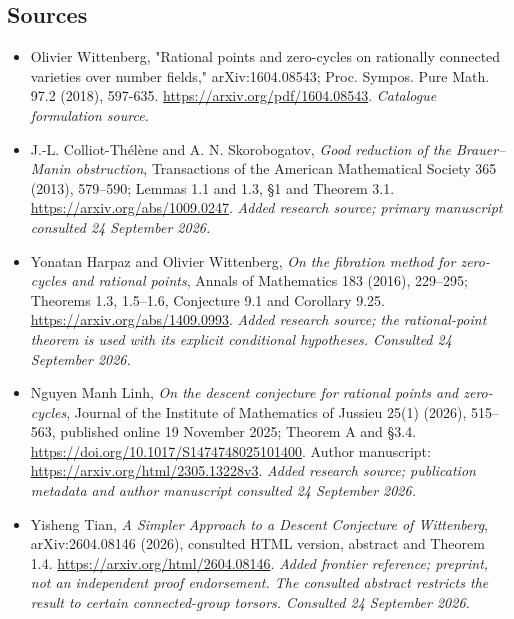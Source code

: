 \documentclass[11pt]{article}
\begin{document}
\subsection{Sources}
\begin{itemize}\raggedright
\item[\textnormal{[S1]}]\hypertarget{source:30003827:1}{} Olivier Wittenberg, "Rational points and zero-cycles on rationally connected varieties over number fields," arXiv:1604.08543; Proc. Sympos. Pure Math. 97.2 (2018), 597-635.
\url{https://arxiv.org/pdf/1604.08543}.
{\small\textit{Catalogue formulation source.}}
\item[\textnormal{[E1]}]\hypertarget{extra:30003827:1}{} J.-L. Colliot-Th\'el\`ene and A. N. Skorobogatov, \emph{Good reduction of the Brauer--Manin obstruction}, Transactions of the American Mathematical Society 365 (2013), 579--590; Lemmas 1.1 and 1.3, \S1 and Theorem 3.1. \url{https://arxiv.org/abs/1009.0247}.
{\small\textit{Added research source; primary manuscript consulted 24 September 2026.}}
\item[\textnormal{[E2]}]\hypertarget{extra:30003827:2}{} Yonatan Harpaz and Olivier Wittenberg, \emph{On the fibration method for zero-cycles and rational points}, Annals of Mathematics 183 (2016), 229--295; Theorems 1.3, 1.5--1.6, Conjecture 9.1 and Corollary 9.25. \url{https://arxiv.org/abs/1409.0993}.
{\small\textit{Added research source; the rational-point theorem is used with its explicit conditional hypotheses. Consulted 24 September 2026.}}
\item[\textnormal{[E3]}]\hypertarget{extra:30003827:3}{} Nguyen Manh Linh, \emph{On the descent conjecture for rational points and zero-cycles}, Journal of the Institute of Mathematics of Jussieu 25(1) (2026), 515--563, published online 19 November 2025; Theorem A and \S3.4. \url{https://doi.org/10.1017/S1474748025101400}. Author manuscript: \url{https://arxiv.org/html/2305.13228v3}.
{\small\textit{Added research source; publication metadata and author manuscript consulted 24 September 2026.}}
\item[\textnormal{[E4]}]\hypertarget{extra:30003827:4}{} Yisheng Tian, \emph{A Simpler Approach to a Descent Conjecture of Wittenberg}, arXiv:2604.08146 (2026), consulted HTML version, abstract and Theorem 1.4. \url{https://arxiv.org/html/2604.08146}.
{\small\textit{Added frontier reference; preprint, not an independent proof endorsement. The consulted abstract restricts the result to certain connected-group torsors. Consulted 24 September 2026.}}
\end{itemize}
\end{document}
